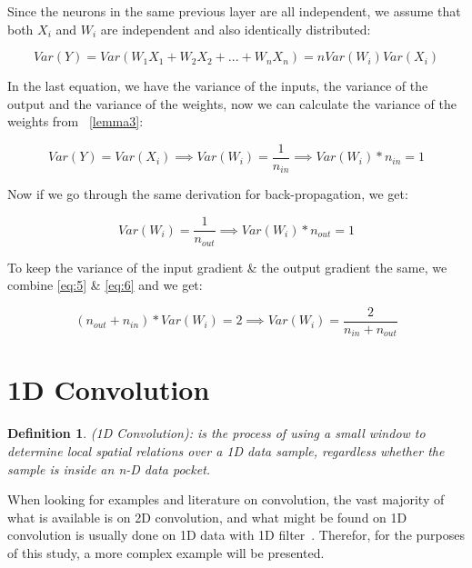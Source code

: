 \documentclass[a4paper, 12pt]{report}
\newtheorem{definition}{Definition}
\begin{document}
Since the neurons in the same previous layer are all independent, we assume that both $ X_i $ and $ W_i $  are independent and also identically distributed:
\begin{center}
	\begin{equation}
	 Var(Y) = Var(W_1X_1 + W_2X_2 + ... + W_n X_n) = nVar(W_i)Var(X_i) \label{eq:4}
	\end{equation}
\end{center}
In the last equation, we have the variance of the inputs, the variance of the output and the variance of the weights, now we can calculate the variance of the weights from ~\cref{lemma3}:
\begin{center}
	\begin{equation}
	 Var(Y) = Var(X_i) \implies Var(W_i) = \frac{1}{n_{in}} \implies Var(W_i) * n_{in} = 1  \label{eq:5}
	\end{equation}
\end{center}
Now if we go through the same derivation for back-propagation, we get:
\begin{center}
	\begin{equation}
	Var(W_i) = \frac{1}{n_{out}} \implies Var(W_i) * n_{out} = 1 \label{eq:6}
	\end{equation}
\end{center}
To keep the variance of the input gradient \& the output gradient the same, we combine
\eqref{eq:5} \& \eqref{eq:6} and we get:
\begin{center}
	\begin{equation}
	(n_{out} + n_{in}) * Var(W_i) = 2 \implies Var(W_i) = \frac{2}{n_{in} + n_{out}} \label{eq:7}
	\end{equation}
\end{center}
\newpage
\section{\textbf{1D Convolution}}\label{Conv1D}
\begin{definition}
	(1D Convolution): is the process of using a small window to determine local spatial relations over a 1D data sample, regardless whether the sample is inside an n-D data pocket.\\
\end{definition}
\vspace{-0.6cm}
When looking for examples and literature on convolution, the vast majority of what is available is on 2D convolution, and what might be found on 1D convolution is usually done on 1D data with 1D filter~\citep{math-behind-1d-convolution-with-advanced-examples-in-tf}.
Therefor, for the purposes of this study, a more complex example will be presented.
\end{document}

